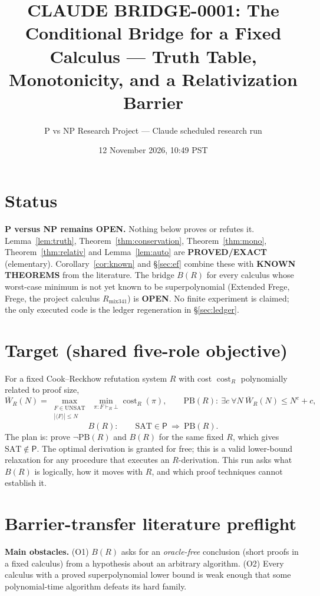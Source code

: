 \documentclass[11pt]{article}
\title{CLAUDE BRIDGE-0001: The Conditional Bridge for a Fixed Calculus --- Truth Table, Monotonicity, and a Relativization Barrier}
\author{P vs NP Research Project --- Claude scheduled research run}
\date{12 November 2026, 10:49 PST}
\theoremstyle{definition}
\newcommand{\Pclass}{\mathsf{P}}
\newcommand{\SAT}{\mathrm{SAT}}
\newcommand{\UNSAT}{\mathrm{UNSAT}}
\newcommand{\Wb}{\overline W}
\newcommand{\PB}{\mathrm{PB}}
\begin{document}
\maketitle

\section*{Status}
\textbf{P versus NP remains OPEN.} Nothing below proves or refutes it.
Lemma~\ref{lem:truth}, Theorem~\ref{thm:conservation}, Theorem~\ref{thm:mono},
Theorem~\ref{thm:relativ} and Lemma~\ref{lem:auto} are \textbf{PROVED/EXACT}
(elementary). Corollary~\ref{cor:known} and \S\ref{sec:ef} combine these with
\textbf{KNOWN THEOREMS} from the literature. The bridge $B(R)$ for every
calculus whose worst-case minimum is not yet known to be superpolynomial
(Extended Frege, Frege, the project calculus $R_{\mathrm{mix341}}$) is
\textbf{OPEN}. No finite experiment is claimed; the only executed code is the
ledger regeneration in \S\ref{sec:ledger}.

\section*{Target (shared five-role objective)}
For a fixed Cook--Reckhow refutation system $R$ with cost $\operatorname{cost}_R$
polynomially related to proof size,
\[
\Wb_R(N)=\max_{\substack{F\in\UNSAT\\|\langle F\rangle|\le N}}\
\min_{\pi:F\vdash_R\bot}\operatorname{cost}_R(\pi),
\qquad
\PB(R):\ \exists c\ \forall N\ \Wb_R(N)\le N^c+c,
\]
\[
B(R):\qquad \SAT\in\Pclass\ \Longrightarrow\ \PB(R).
\]
The plan is: prove $\neg\PB(R)$ and $B(R)$ for the same fixed $R$, which gives
$\SAT\notin\Pclass$. The optimal derivation is granted for free; this is a
valid lower-bound relaxation for any procedure that executes an $R$-derivation.
This run asks what $B(R)$ is logically, how it moves with $R$, and which proof
techniques cannot establish it.

\section{Barrier-transfer literature preflight}
\textbf{Main obstacles.} (O1) $B(R)$ asks for an \emph{oracle-free} conclusion
(short proofs in a fixed calculus) from a hypothesis about an arbitrary
algorithm. (O2) Every calculus with a proved superpolynomial lower bound is weak
enough that some polynomial-time algorithm defeats its hard family.
\end{document}
